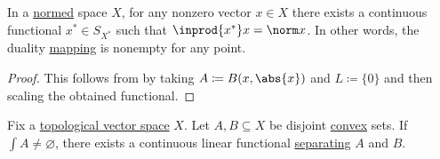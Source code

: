\begin{corollary}\label{thm:hahn_banach_implies_duality_mapping_nonempty}\mcite\cite[25]{Йоффе1974}
  In a \hyperref[def:norm]{normed} space \( X \), for any nonzero vector \( x \in X \) there exists a continuous functional \( x^* \in S_{X^*} \) such that \( \inprod {x^*} x = \norm x \). In other words, the duality \hyperref[def:duality_mapping]{mapping} is nonempty for any point.
\end{corollary}
\begin{proof}
  This follows from  by taking \( A \coloneqq B(x, \abs{x}) \) and \( L \coloneqq \{ 0 \} \) and then scaling the obtained functional.
\end{proof}

\begin{theorem}\label{thm:hahn_banach_hyperplane_separation}\mcite\cite[25]{Йоффе1974}
  Fix a \hyperref[def:topological_vector_space]{topological vector space} \( X \). Let \( A, B \subseteq X \) be disjoint \hyperref[def:convex_set]{convex} sets. If \( \int{A} \neq \varnothing \), there exists a continuous linear functional \hyperref[def:hyperplane_separation]{separating} \( A \) and \( B \).
\end{theorem}
